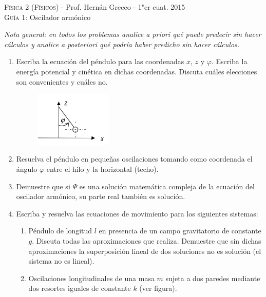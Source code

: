 \documentclass[11pt,spanish,a4paper]{article}
\begin{document}
\begin{center}
    \textsc{\large Física 2 (Físicos)} - Prof. Hernán Grecco - 1"er cuat. 2015\\
	\textsc{\large Guía 1:} Oscilador armónico
\end{center}
\centering
\emph{Nota general: en todos los problemas analice a priori qué puede predecir sin
	hacer cálculos y analice a posteriori qué podría haber predicho sin hacer
cálculos.}


\begin{enumerate}


\item Escriba la ecuación del péndulo para las coordenadas \(x\), \(z\) y \(\varphi\).
	Escriba la energía potencial y cinética en dichas coordenadas.
	Discuta cuáles elecciones son convenientes y cuáles no.
	\begin{figure}[h]
		\centering{}\includegraphics[width=0.35\textwidth]{guia1_e1}
	\end{figure}


\item Resuelva el péndulo en pequeñas oscilaciones tomando como coordenada el
	ángulo \(\varphi\) entre el hilo y la horizontal (techo).


\item Demuestre que si \(\Psi\) es una solución matemática compleja de la ecuación del oscilador armónico, su parte real también es solución.


\item Escriba y resuelva las ecuaciones de movimiento para los siguientes sistemas:
	\begin{enumerate}
		\item Péndulo de longitud \(l\) en presencia de un campo gravitatorio de constante \(g\).
			Discuta todas las aproximaciones que realiza.
			Demuestre que sin dichas aproximaciones la superposición lineal de dos soluciones no es solución (el sistema no es lineal).

		\item Oscilaciones longitudinales de una masa \(m\) sujeta a dos paredes mediante dos resortes iguales de constante \(k\) (ver figura).%


\end{enumerate}
\end{enumerate}
\end{document}
